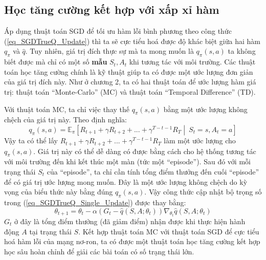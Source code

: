 \subsection{Học tăng cường kết hợp với xấp xỉ hàm}
	Áp dụng thuật toán SGD để tối ưu hàm lỗi bình phương theo công thức (\ref{eq_SGDTrueQ_Update}) thì ta sẽ cực tiểu hoá được độ khác biệt giữa hai hàm $q_{\pi}$ và $\hat{q}$.
	Tuy nhiên, giá trị đích thực sự mà ta mong muốn là $q_{\pi}(s,a)$ ta không biết được mà chỉ có một số \textbf{mẫu} $S_t, A_t$ khi tương tác với môi trường.
	Các thuật toán học tăng cường chính là kỹ thuật giúp ta có được một ước lượng đơn giản của giá trị đích này.
	Như ở chương 2, ta có hai thuật toán để ước lượng hàm giá trị: thuật toán ``Monte-Carlo'' (MC) và thuật toán ``Temporal Difference'' (TD).
	
	Với thuật toán MC, ta chỉ việc thay thế $q_{\pi}(s,a)$ bằng một ước lượng không chệch của giá trị này.
	Theo định nghĩa:
	\begin{equation}
		\label{eq_q_def}
		q_{\pi}(s,a) = \mathbb{E}_{\pi}\left [R_{t+1} + \gamma R_{t + 2} + ... + \gamma^{T-t-1}R_T \middle|\ \mathit{S}_t=s, \mathit{A}_t=a\right ]
	\end{equation}
	Vậy ta có thể lấy $R_{t+1} + \gamma R_{t + 2} + ... + \gamma^{T-t-1}R_T$ làm một ước lượng cho $q_{\pi}(s,a)$.
	Giá trị này có thể dễ dàng có được bằng cách cho hệ thống tương tác với môi trường đến khi kết thúc một màn (tức một ``episode'').
	Sau đó với mỗi trạng thái $S_t$ của ``episode'', ta chỉ cần tính tổng điểm thưởng đến cuối ``episode'' để có giá trị ước lượng mong muốn.
	Đây là một ước lượng không chệch do kỳ vọng của biểu thức này bằng đúng $q_{\pi}(s,a)$.
	Vậy công thức cập nhật bộ trọng số trong (\ref{eq_SGDTrueQ_Single_Update}) được thay bằng:
	\begin{equation}
		\label{eq_SGD_MC_Update}
		\theta_{t+1} = \theta_t - \alpha (G_t - \hat{q}(S,A;\theta_t)) \nabla_{\theta_t} \hat{q}(S, A;\theta_t)
	\end{equation}
	$G_t$ ở đây là tổng điểm thưởng (đã giảm điểm) nhận được khi thực hiện hành động $A$ tại trạng thái $S$.
	Kết hợp thuật toán MC với thuật toán SGD để cực tiểu hoá hàm lỗi của mạng nơ-ron, ta có được một thuật toán học tăng cường kết hợp học sâu hoàn chỉnh để giải các bài toán có số trạng thái lớn.
	
